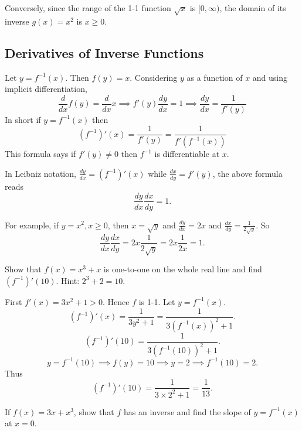 \documentclass[../calc1-main.tex]{subfiles}
\begin{document}
Conversely, since the range of the 1-1 function $\sqrt{x}$ is $[0, \infty)$, the domain of its inverse $g(x) = x^2$ is $x\ge0$.
\subsection*{Derivatives of Inverse Functions}

Let $y = f^{-1}(x)$. Then $f(y)=x$. Considering $y$ as a function of $x$ and using implicit differentiation,
\[
  \frac{d}{dx} f(y) = \frac{d}{dx} x \implies f'(y) \frac{dy}{dx} = 1 \implies \frac{dy}{dx} = \frac{1}{f'(y)}
\]
In short if $y=f^{-1}(x)$ then
\[
  (f^{-1})'(x) = \frac{1}{f'(y)} = \frac{1}{f'(f^{-1}(x))}
\]
This formula says if $f'(y) \neq 0$ then $f^{-1}$ is differentiable at $x$.

\begin{figure}[H]
  \centering
  
\end{figure}


In Leibniz notation, $\frac{dy}{dx} = (f^{-1})'(x)$ while $\frac{dx}{dy} = f'(y)$, the above formula reads
\[
  \frac{dy}{dx} \frac{dx}{dy} = 1.
\]

For example, if $y=x^2, x\ge 0$, then $x=\sqrt{y}$ and $\frac{dy}{dx} = 2x$ and $\frac{dx}{dy} = \frac{1}{2\sqrt{y}}$. So
\[
  \frac{dy}{dx} \frac{dx}{dy} = 2x \frac{1}{2\sqrt{y}} = 2x \frac{1}{2x} = 1.
\]
\begin{example}
  Show that $f(x) = x^3 + x$ is one-to-one on the whole real line and find $(f^{-1})'(10)$. Hint: $2^3 + 2 = 10$.
\end{example}
\begin{solution}
  First $f'(x) = 3x^2 + 1 >0$. Hence $f$ is 1-1.
  Let $y = f^{-1}(x)$.
  \[
    (f^{-1})'(x) = \frac{1}{3 y^2 + 1} = \frac{1}{3 (f^{-1}(x))^2 + 1}.
  \]
  \[
    (f^{-1})'(10) = \frac{1}{3 (f^{-1}(10))^2 + 1}.
  \]
  \[
    y = f^{-1}(10) \implies f(y) = 10 \implies y = 2 \implies f^{-1}(10) = 2.
  \]
  Thus
  \[
    (f^{-1})'(10) = \frac{1}{3\times2^2 + 1} = \frac{1}{13}.
  \]
\end{solution}

\begin{example}
  If $f(x) = 3x + x^3$, show that $f$ has an inverse and find the slope of $y=f^{-1}(x)$ at $x=0$.
\end{example}
\end{document}
